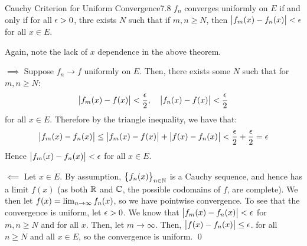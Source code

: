 \begin{theorem}{Cauchy Criterion for Uniform Convergence}{7.8}
    $f_n$ converges uniformly on $E$ if and only if for all $\epsilon > 0$, thre exists $N$ such that if $m, n \geq N$, then $\abs{f_m(x) - f_n(x)} < \epsilon$ for all $x \in E$. 
\end{theorem}
\noindent Again, note the lack of $x$ dependence in the above theorem.
\begin{nproof}
    $\boxed{\implies}$ Suppose $f_n \rightarrow f$ uniformly on $E$. Then, there exists some $N$ such that for $m, n \geq N$:
    \begin{align*}
        \abs{f_m(x) - f(x)} < \frac{\epsilon}{2}, \quad \abs{f_n(x) - f(x)} < \frac{\epsilon}{2}
    \end{align*}
    for all $x \in E$. Therefore by the triangle inequality, we have that:
    \begin{align*}
        \abs{f_m(x) - f_n(x)} \leq \abs{f_m(x) - f(x)} + \abs{f(x) - f_n(x)} < \frac{\epsilon}{2} + \frac{\epsilon}{2} = \epsilon
    \end{align*}
    Hence $\abs{f_m(x) - f_n(x)} < \epsilon$ for all $x \in E$. 

    $\boxed{\impliedby}$ Let $x \in E$. By assumption, $\set{f_n(x)}_{n \in \mathbb{N}}$ is a Cauchy sequence, and hence has a limit $f(x)$ (as both $\mathbb{R}$ and $\mathbb{C}$, the possible codomains of $f$, are complete). We then let $f(x) = \lim_{n \rightarrow \infty} f_n(x)$, so we have pointwise convergence. To see that the convergence is uniform, let $\epsilon > 0$. We know that $\abs{f_m(x) - f_n(x)} < \epsilon$ for $m, n \geq N$ and for all $x$. Then, let $m \rightarrow \infty$. Then, $\abs{f(x) - f_n(x)} \leq \epsilon$. for all $n \geq N$ and all $x \in E$, so the convergence is uniform. \qed
\end{nproof}


